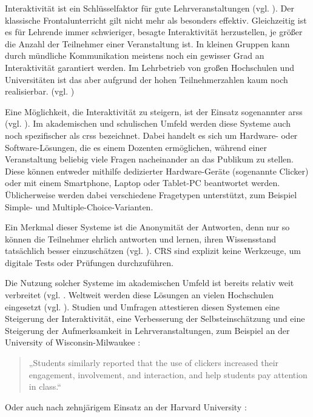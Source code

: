 Interaktivität ist ein Schlüsselfaktor für gute Lehrveranstaltungen (vgl. \cite[S. 1]{art:ieee}). Der klassische Frontalunterricht gilt nicht mehr als besonders effektiv. Gleichzeitig ist es für Lehrende immer schwieriger, besagte Interaktivität herzustellen, je größer die Anzahl der Teilnehmer einer Veranstaltung ist. In kleinen Gruppen kann durch mündliche Kommunikation meistens noch ein gewisser Grad an Interaktivität garantiert werden. Im Lehrbetrieb von großen Hochschulen und Universitäten ist das aber aufgrund der hohen Teilnehmerzahlen kaum noch realisierbar. (vgl. \cite[S. 389]{art:crs_informatik_spektrum})


Eine Möglichkeit, die Interaktivität zu steigern, ist der Einsatz sogenannter \acp{ars} (vgl. \cite[S. 5]{art:ieee}). Im akademischen und schulischen Umfeld werden diese Systeme auch noch spezifischer als \acp{crs} bezeichnet. Dabei handelt es sich um Hardware- oder Software-Lösungen, die es einem Dozenten ermöglichen, während einer Veranstaltung beliebig viele Fragen nacheinander an das Publikum zu stellen. Diese können entweder mithilfe dedizierter Hardware-Geräte (sogenannte Clicker) oder mit einem Smartphone, Laptop oder Tablet-PC beantwortet werden. Üblicherweise werden dabei verschiedene Fragetypen unterstützt, zum Beispiel Simple- und Multiple-Choice-Varianten.

Ein Merkmal dieser Systeme ist die Anonymität der Antworten, denn nur so können die Teilnehmer ehrlich antworten und lernen, ihren Wissensstand tatsächlich besser einzuschätzen (vgl. \cite[S. 106]{art:crs_literature_review}). CRS sind explizit keine Werkzeuge, um digitale Tests oder Prüfungen durchzuführen.

Die Nutzung solcher Systeme im akademischen Umfeld ist bereits relativ weit verbreitet (vgl. \cite[S. 392]{art:crs_informatik_spektrum}. Weltweit werden diese Lösungen an vielen Hochschulen eingesetzt (vgl. \cite{web:elanwiki}). Studien und Umfragen attestieren diesen Systemen eine Steigerung der Interaktivität, eine Verbesserung der Selbsteinschätzung und eine Steigerung der Aufmerksamkeit in Lehrveranstaltungen, zum Beispiel an der University of Wisconsin-Milwaukee \cite[S. 5]{paper:wisconsin_clicker}:

\begin{quote}
„Students similarly reported that the use of clickers increased their engagement, involvement, and interaction, and help students pay attention in class.“
\end{quote}

Oder auch nach zehnjärigem Einsatz an der Harvard University \cite[S. 6]{paper:harvard_tenyears}:

